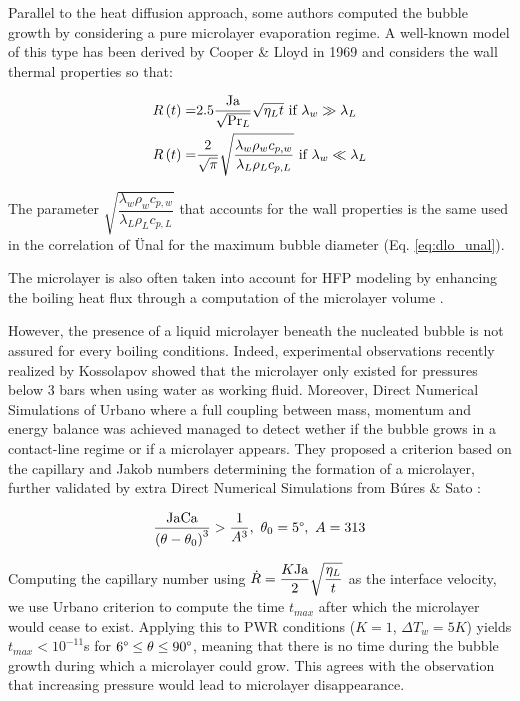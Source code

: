 Parallel to the heat diffusion approach, some authors computed the bubble growth by considering a pure microlayer evaporation regime. A well-known model of this type has been derived by Cooper \& Lloyd in 1969 \cite{cooper_microlayer_1969} and considers the wall thermal properties so that:

\begin{align} 
R\parth{t} =& 2.5 \dfrac{\Ja}{\sqrt{\Pr_{L}}}\sqrt{\eta_{L}t}\ \text{if}\ \lambda_{w} \gg \lambda_{L} \\
%
R\parth{t} =& \dfrac{2}{\sqrt{\pi}} \sqrt{\dfrac{\lambda_{w}\rho_{w}c_{p,w}}{\lambda_{L}\rho_{L}c_{p,L}}}\ \text{if}\ \lambda_{w} \ll \lambda_{L}
\end{align}

\begin{remark*}{}
The parameter $ \sqrt{\dfrac{\lambda_{w}\rho_{w}c_{p,w}}{\lambda_{L}\rho_{L}c_{p,L}}}$ that accounts for the wall properties is the same used in the correlation of \"Unal for the maximum bubble diameter (Eq. \ref{eq:dlo_unal}).
\end{remark*}

The microlayer is also often taken into account for HFP modeling by enhancing the boiling heat flux through a computation of the microlayer volume \cite{kommajosyula_development_2020, demarly_new_2020}. 

\npar

However, the presence of a liquid microlayer beneath the nucleated bubble is not assured for every boiling conditions. Indeed, experimental observations recently realized by Kossolapov \cite{kossolapov_experimental_2021} showed that the microlayer only existed for pressures below 3 bars when using water as working fluid. Moreover, Direct Numerical Simulations of Urbano \etal \cite{urbano_direct_2018} where a full coupling between mass, momentum and energy balance was achieved managed to detect wether if the bubble grows in a contact-line regime or if a microlayer appears. They proposed a criterion based on the capillary and Jakob numbers determining the formation of a microlayer, further validated by extra Direct Numerical Simulations from B\'ures \& Sato \cite{bures_modelling_2021}:

\begin{equation}
\frac{\mathrm{Ja} \mathrm{Ca}}{\left( \theta-\theta_{0} \right)^{3}} > \frac{1}{A^{3}},\ \theta_{0}=5\degree,\ A=313
\end{equation}

\begin{remark*}{}
Computing the capillary number using $\dot{R}=\dfrac{K\mathrm{Ja}}{2}\sqrt{\dfrac{\eta_{L}}{t}}$ as the interface velocity, we use Urbano \etal criterion to compute the time $t_{max}$ after which the microlayer would cease to exist. Applying this to PWR conditions ($K=1$, $\Delta T_{w}=5K$) yields $t_{max}<10^{-11}$s for $6\degree \leq \theta \leq 90\degree$, meaning that there is no time during the bubble growth during which a microlayer could grow. This agrees with the observation that increasing pressure would lead to microlayer disappearance.
\end{remark*}

